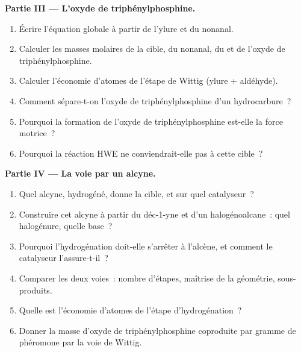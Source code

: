 \begin{problem}
\medskip
\noindent\textbf{Partie III --- L'oxyde de triphénylphosphine.}
\begin{enumerate}[resume]
  \item Écrire l'équation globale à partir de l'ylure et du nonanal.
  \item Calculer les masses molaires de la cible, du nonanal, du  et de l'oxyde de
        triphénylphosphine.
  \item Calculer l'économie d'atomes de l'étape de Wittig (ylure + aldéhyde).
  \item Comment sépare-t-on l'oxyde de triphénylphosphine d'un hydrocarbure~?
  \item Pourquoi la formation de l'oxyde de triphénylphosphine est-elle la force motrice~?
  \item Pourquoi la réaction HWE ne conviendrait-elle pas à cette cible~?
\end{enumerate}

\medskip
\noindent\textbf{Partie IV --- La voie par un alcyne.}
\begin{enumerate}[resume]
  \item Quel alcyne, hydrogéné, donne la cible, et sur quel catalyseur~?
  \item Construire cet alcyne à partir du déc-1-yne et d'un halogénoalcane~: quel halogénure, quelle base~?
  \item Pourquoi l'hydrogénation doit-elle s'arrêter à l'alcène, et comment le catalyseur l'assure-t-il~?
  \item Comparer les deux voies~: nombre d'étapes, maîtrise de la géométrie, sous-produits.
  \item Quelle est l'économie d'atomes de l'étape d'hydrogénation~?
  \item Donner la masse d'oxyde de triphénylphosphine coproduite par gramme de phéromone par la voie de
        Wittig.
\end{enumerate}
\end{problem}
